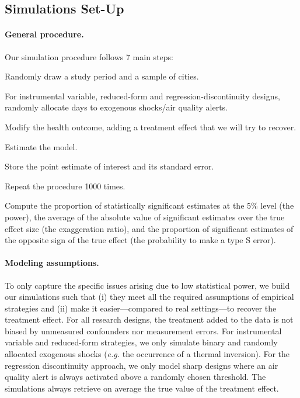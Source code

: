 \documentclass[12pt]{article}
\newenvironment{senumerate}{\enumerate\addtolength{\itemsep}{-10pt}}{\endenumerate} %
\begin{document}
        \subsection{Simulations Set-Up}
        
        \paragraph{General procedure.} Our simulation procedure follows 7 main steps:
        
        \begin{sloppypar}
        \begin{senumerate}
            \item Randomly draw a study period and a sample of cities.
            \item For instrumental variable, reduced-form and regression-discontinuity designs, randomly allocate days to exogenous shocks/air quality alerts.
            \item Modify the health outcome, adding a treatment effect that we will try to recover.
            \item Estimate the model.
            \item Store the point estimate of interest and its standard error.
            \item Repeat the procedure 1000 times.
            \item Compute the proportion of statistically significant estimates at the 5\% level (the power), the average of the absolute value of significant estimates over the true effect size (the exaggeration ratio), and the proportion of significant estimates of the opposite sign of the true effect (the probability to make a type S error). 
        \end{senumerate}
        \end{sloppypar}
        
        \paragraph{Modeling assumptions.} To only capture the specific issues arising due to low statistical power, we build our simulations such that (i) they meet all the required assumptions of empirical strategies and (ii) make it easier---compared to real settings---to recover the treatment effect. For all research designs, the treatment added to the data is not biased by unmeasured confounders nor measurement errors. For instrumental variable and reduced-form strategies, we only simulate binary and randomly allocated exogenous shocks (\textit{e.g.} the occurrence of a thermal inversion). For the regression discontinuity approach, we only model sharp designs where an air quality alert is always activated above a randomly chosen threshold. The simulations always retrieve on average the true value of the treatment effect.
     
\end{document}
